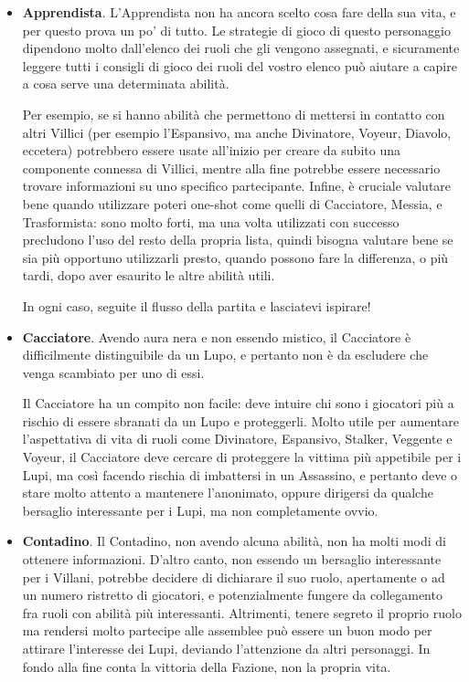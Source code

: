 \documentclass[a4paper,10pt]{article}
\begin{document}
\begin{itemize}
	
	\item {\bf Apprendista}. L'Apprendista non ha ancora scelto cosa fare della sua vita, e per questo prova un po' di tutto. Le strategie di gioco di questo personaggio dipendono molto dall'elenco dei ruoli che gli vengono assegnati, e sicuramente leggere tutti i consigli di gioco dei ruoli del vostro elenco può aiutare a capire a cosa serve una determinata abilità.
	
	Per esempio, se si hanno abilità che permettono di mettersi in contatto con altri Villici (per esempio l'Espansivo, ma anche Divinatore, Voyeur, Diavolo, eccetera) potrebbero essere usate all'inizio per creare da subito una componente connessa di Villici, mentre alla fine potrebbe essere necessario trovare informazioni su uno specifico partecipante. Infine, è cruciale valutare bene quando utilizzare poteri one-shot come quelli di Cacciatore, Messia, e Trasformista: sono molto forti, ma una volta utilizzati con successo precludono l'uso del resto della propria lista, quindi bisogna valutare bene se sia più opportuno utilizzarli presto, quando possono fare la differenza, o più tardi, dopo aver esaurito le altre abilità utili.
	
	In ogni caso, seguite il flusso della partita e lasciatevi ispirare! 

	\item {\bf Cacciatore}. Avendo aura nera e non essendo mistico, il Cacciatore è difficilmente distinguibile da un Lupo, e pertanto non è da escludere che venga scambiato per uno di essi. 
	
	Il Cacciatore ha un compito non facile: deve intuire chi sono i giocatori più a rischio di essere sbranati da un Lupo e proteggerli. Molto utile per aumentare l'aspettativa di vita di ruoli come Divinatore, Espansivo, Stalker, Veggente e Voyeur, il Cacciatore deve cercare di proteggere la vittima più appetibile per i Lupi, ma così facendo rischia di imbattersi in un Assassino, e pertanto deve o stare molto attento a mantenere l'anonimato, oppure dirigersi da qualche bersaglio interessante per i Lupi, ma non completamente ovvio.
	
	\item {\bf Contadino}. Il Contadino, non avendo alcuna abilità, non ha molti modi di ottenere informazioni. D'altro canto, non essendo un bersaglio interessante per i Villani, potrebbe decidere di dichiarare il suo ruolo, apertamente o ad un numero ristretto di giocatori, e potenzialmente fungere da collegamento fra ruoli con abilità più interessanti. Altrimenti, tenere segreto il proprio ruolo ma rendersi molto partecipe alle assemblee può essere un buon modo per attirare l'interesse dei Lupi, deviando l'attenzione da altri personaggi. In fondo alla fine conta la vittoria della Fazione, non la propria vita.
	

\end{itemize}
\end{document}
